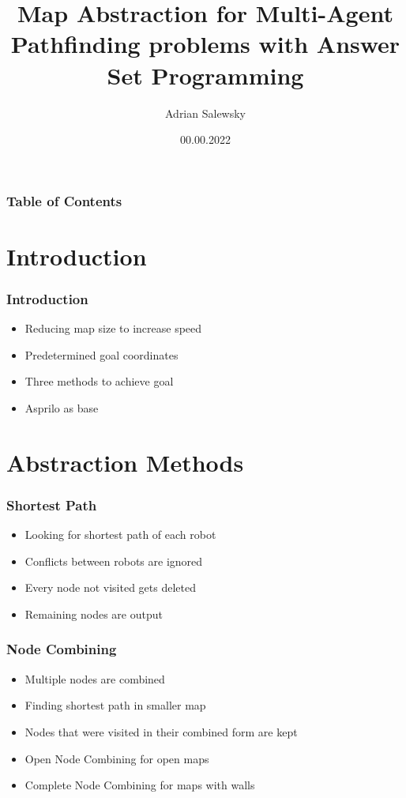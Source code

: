 \documentclass{beamer}
\title{Map Abstraction for Multi-Agent Pathfinding problems with Answer Set Programming}
\author[Adrian Salewsky]{Adrian Salewsky}
\institute{University of Potsdam}
\date{00.00.2022}
\begin{document}
\frame{\titlepage}

\begin{frame}
\frametitle{Table of Contents}
\tableofcontents
\end{frame}

\section{Introduction} 
\begin{frame}
\frametitle{Introduction}
\begin{itemize}
\item<2-> Reducing map size to increase speed
\medskip
\item<3-> Predetermined goal coordinates
\medskip
\item<4-> Three methods to achieve goal
\medskip
\item<5-> Asprilo as base
\end{itemize}
\end{frame}


\section{Abstraction Methods}
\begin{frame}
\frametitle{Shortest Path}
\begin{itemize}
\item<2-> Looking for shortest path of each robot
\medskip
\item<3-> Conflicts between robots are ignored
\medskip
\item<4-> Every node not visited gets deleted
\medskip
\item<5-> Remaining nodes are output
\end{itemize}
\end{frame}


\begin{frame}
\frametitle{Node Combining}
\begin{itemize}
\item<2-> Multiple nodes are combined
\medskip
\item<3-> Finding shortest path in smaller map
\medskip
\item<4-> Nodes that were visited in their combined form are kept
\medskip
\item<5-> Open Node Combining for open maps
\item<6-> Complete Node Combining for maps with walls
\end{itemize}
\end{frame}
\end{document}
